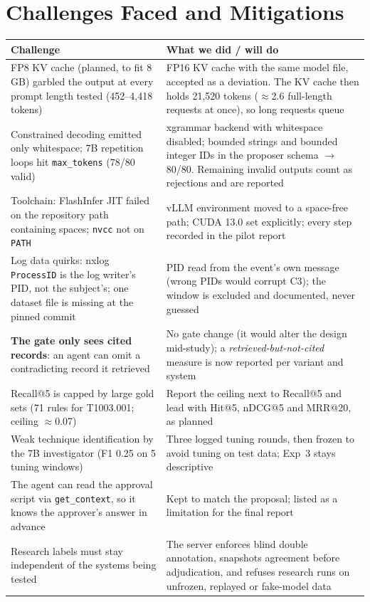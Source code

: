 \documentclass[11pt,a4paper]{article}
\newcommand{\code}[1]{\texttt{\small #1}}
\begin{document}
\section{Challenges Faced and Mitigations}
\label{sec:challenges}
{\small
\begin{tabularx}{\linewidth}{@{}LL@{}}
\toprule
\textbf{Challenge} & \textbf{What we did / will do}\\
\midrule
FP8 KV cache (planned, to fit 8\,GB) garbled the output at every prompt length tested (452--4,418 tokens) & FP16 KV cache with the same model file, accepted as a deviation. The KV cache then holds 21,520 tokens ($\approx$2.6 full-length requests at once), so long requests queue \\
Constrained decoding emitted only whitespace; 7B repetition loops hit \code{max\_tokens} (78/80 valid) & xgrammar backend with whitespace disabled; bounded strings and bounded integer IDs in the proposer schema $\to$ 80/80. Remaining invalid outputs count as rejections and are reported \\
Toolchain: FlashInfer JIT failed on the repository path containing spaces; \code{nvcc} not on \code{PATH} & vLLM environment moved to a space-free path; CUDA 13.0 set explicitly; every step recorded in the pilot report \\
Log data quirks: nxlog \code{ProcessID} is the log writer's PID, not the subject's; one dataset file is missing at the pinned commit & PID read from the event's own message (wrong PIDs would corrupt C3); the window is excluded and documented, never guessed \\
\textbf{The gate only sees cited records}: an agent can omit a contradicting record it retrieved & No gate change (it would alter the design mid-study); a \emph{retrieved-but-not-cited} measure is now reported per variant and system \\
Recall@5 is capped by large gold sets (71 rules for T1003.001; ceiling $\approx$0.07) & Report the ceiling next to Recall@5 and lead with Hit@5, nDCG@5 and MRR@20, as planned \\
Weak technique identification by the 7B investigator (F1 0.25 on 5 tuning windows) & Three logged tuning rounds, then frozen to avoid tuning on test data; Exp~3 stays descriptive \\
The agent can read the approval script via \code{get\_context}, so it knows the approver's answer in advance & Kept to match the proposal; listed as a limitation for the final report \\
Research labels must stay independent of the systems being tested & The server enforces blind double annotation, snapshots agreement before adjudication, and refuses research runs on unfrozen, replayed or fake-model data \\
\bottomrule
\end{tabularx}}
\end{document}
